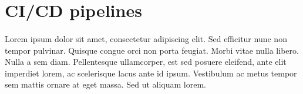 \section{CI/CD pipelines}
\paragraph{}  Lorem ipsum dolor sit amet, consectetur adipiscing elit. Sed efficitur nunc non tempor pulvinar. Quisque congue orci non porta feugiat. Morbi vitae nulla libero. Nulla a sem diam. Pellentesque ullamcorper, est sed posuere eleifend, ante elit imperdiet lorem, ac scelerisque lacus ante id ipsum. Vestibulum ac metus tempor sem mattis ornare at eget massa. Sed ut aliquam lorem. 